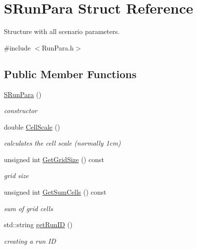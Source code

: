 \hypertarget{struct_s_run_para}{}\section{S\+Run\+Para Struct Reference}
\label{struct_s_run_para}


Structure with all scenario parameters.  




{\ttfamily \#include $<$Run\+Para.\+h$>$}

\subsection*{Public Member Functions}
\begin{DoxyCompactItemize}
\item 
\mbox{\hyperlink{struct_s_run_para_a98ac754a6dfdc060af1d68b45501b40f}{S\+Run\+Para}} ()
\begin{DoxyCompactList}\small\item\em constructor \end{DoxyCompactList}\item 
\mbox{\label{struct_s_run_para_aa435d77725d635497f967256011bdd58}} 
double \mbox{\hyperlink{struct_s_run_para_aa435d77725d635497f967256011bdd58}{Cell\+Scale}} ()
\begin{DoxyCompactList}\small\item\em calculates the cell scale (normally 1cm) \end{DoxyCompactList}\item 
\mbox{\label{struct_s_run_para_ae0585b8e54ab34d2863c096311bb7e7f}} 
unsigned int \mbox{\hyperlink{struct_s_run_para_ae0585b8e54ab34d2863c096311bb7e7f}{Get\+Grid\+Size}} () const
\begin{DoxyCompactList}\small\item\em grid size \end{DoxyCompactList}\item 
\mbox{\label{struct_s_run_para_a84761082af964b7d0528ee9bf4fc8274}} 
unsigned int \mbox{\hyperlink{struct_s_run_para_a84761082af964b7d0528ee9bf4fc8274}{Get\+Sum\+Cells}} () const
\begin{DoxyCompactList}\small\item\em sum of grid cells \end{DoxyCompactList}\item 
std\+::string \mbox{\hyperlink{struct_s_run_para_ac365498be97ac6c0cf59c57fda1039e7}{get\+Run\+ID}} ()
\begin{DoxyCompactList}\small\item\em creating a run ID \end{DoxyCompactList}\end{DoxyCompactItemize}
